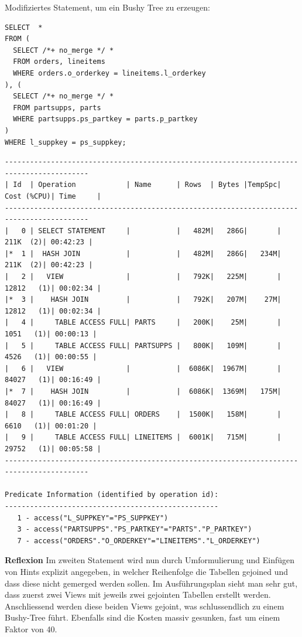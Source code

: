 \documentclass[10pt]{article}
\begin{document}
Modifiziertes Statement, um ein Bushy Tree zu erzeugen:
\begin{lstlisting}[style=sql]
SELECT  *
FROM (
  SELECT /*+ no_merge */ *
  FROM orders, lineitems
  WHERE orders.o_orderkey = lineitems.l_orderkey
), (
  SELECT /*+ no_merge */ *
  FROM partsupps, parts
  WHERE partsupps.ps_partkey = parts.p_partkey
)
WHERE l_suppkey = ps_suppkey;
\end{lstlisting}
\begin{lstlisting}[style=queryexecutionplan]
------------------------------------------------------------------------------------------
| Id  | Operation            | Name      | Rows  | Bytes |TempSpc| Cost (%CPU)| Time     |
------------------------------------------------------------------------------------------
|   0 | SELECT STATEMENT     |           |   482M|   286G|       |   211K  (2)| 00:42:23 |
|*  1 |  HASH JOIN           |           |   482M|   286G|   234M|   211K  (2)| 00:42:23 |
|   2 |   VIEW               |           |   792K|   225M|       | 12812   (1)| 00:02:34 |
|*  3 |    HASH JOIN         |           |   792K|   207M|    27M| 12812   (1)| 00:02:34 |
|   4 |     TABLE ACCESS FULL| PARTS     |   200K|    25M|       |  1051   (1)| 00:00:13 |
|   5 |     TABLE ACCESS FULL| PARTSUPPS |   800K|   109M|       |  4526   (1)| 00:00:55 |
|   6 |   VIEW               |           |  6086K|  1967M|       | 84027   (1)| 00:16:49 |
|*  7 |    HASH JOIN         |           |  6086K|  1369M|   175M| 84027   (1)| 00:16:49 |
|   8 |     TABLE ACCESS FULL| ORDERS    |  1500K|   158M|       |  6610   (1)| 00:01:20 |
|   9 |     TABLE ACCESS FULL| LINEITEMS |  6001K|   715M|       | 29752   (1)| 00:05:58 |
------------------------------------------------------------------------------------------

Predicate Information (identified by operation id):
---------------------------------------------------
   1 - access("L_SUPPKEY"="PS_SUPPKEY")
   3 - access("PARTSUPPS"."PS_PARTKEY"="PARTS"."P_PARTKEY")
   7 - access("ORDERS"."O_ORDERKEY"="LINEITEMS"."L_ORDERKEY")
\end{lstlisting}
\textbf{Reflexion} \newline
Im zweiten Statement wird nun durch Umformulierung und Einfügen von Hints explizit angegeben, in welcher Reihenfolge die Tabellen gejoined und dass diese nicht gemerged werden sollen. Im Ausführungsplan sieht man sehr gut, dass zuerst zwei Views mit jeweils zwei gejointen Tabellen erstellt werden. Anschliessend werden diese beiden Views gejoint, was schlussendlich zu einem Bushy-Tree führt. Ebenfalls sind die Kosten massiv gesunken, fast um einem Faktor von 40.
\end{document}
